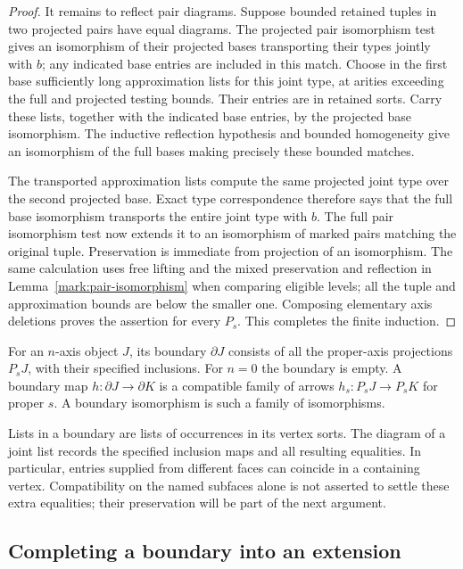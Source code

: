 \begin{proof}
It remains to reflect pair diagrams. Suppose bounded retained
tuples in two projected pairs have equal diagrams. The projected
pair isomorphism test gives an isomorphism of their projected
bases transporting their types jointly with $b$; any indicated
base entries are included in this match. Choose in the first
base sufficiently long approximation lists for this joint type,
at arities exceeding the full and projected testing bounds.
Their entries are in retained sorts. Carry these lists, together
with the indicated base entries, by the projected base
isomorphism. The inductive reflection hypothesis and bounded
homogeneity give an isomorphism of the full bases making
precisely these bounded matches.

The transported approximation lists compute the same projected
joint type over the second projected base. Exact type
correspondence therefore says that the full base isomorphism
transports the entire joint type with $b$. The full pair
isomorphism test now extends it to an isomorphism of marked
pairs matching the original tuple. Preservation is immediate
from projection of an isomorphism. The same calculation uses
free lifting and the mixed preservation and reflection in
Lemma~\ref{mark:pair-isomorphism} when comparing eligible levels;
all the tuple and approximation bounds are below the smaller
one. Composing elementary axis deletions proves the assertion
for every $P_s$. This completes the finite induction.
\end{proof}

\begin{definition}[Boundary]
\label{iter:boundary}
For an $n$-axis object $J$, its boundary $\partial J$ consists
of all the proper-axis projections $P_sJ$, with their specified
inclusions. For $n=0$ the boundary is empty. A boundary map
$h:\partial J\to\partial K$ is a compatible family of arrows
$h_s:P_sJ\to P_sK$ for proper $s$. A boundary isomorphism is
such a family of isomorphisms.

Lists in a boundary are lists of occurrences in its vertex
sorts. The diagram of a joint list records the specified
inclusion maps and all resulting equalities. In particular,
entries supplied from different faces can coincide in a
containing vertex. Compatibility on the named subfaces alone
is not asserted to settle these extra equalities; their
preservation will be part of the next argument.
\end{definition}

\subsection{Completing a boundary into an extension}

